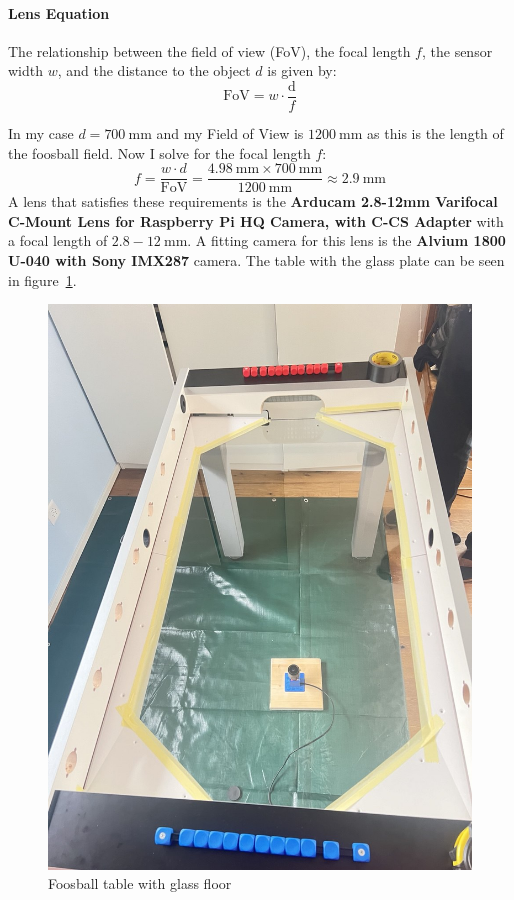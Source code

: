 \paragraph{Lens Equation}\label{par:lens_equation}

The relationship between the field of view (FoV), the focal length $f$, the sensor width $w$, and the distance to the object $d$ is given by:
\begin{equation}
    \text{FoV} = w \cdot \frac{\text{d}}{f}\label{eq:lens_equation}
\end{equation}


\noindent In my case $d = \qty[per-mode=symbol]{700}{\mm}$ and my Field of View is $\qty[per-mode=symbol]{1200}{\mm}$ as this is the length of the foosball field.
Now I solve for the focal length $f$:
\begin{equation}
    \label{eq:focal_length}
    f = \frac{w \cdot d}{\text{FoV}} = \frac{\qty[per-mode=symbol]{4.98}{\mm} \times \qty[per-mode=symbol]{700}{\mm}}{\qty[per-mode=symbol]{1200}{\mm}} \approx \qty[per-mode=symbol]{2.9}{\mm}
\end{equation}
A lens that satisfies these requirements is the \textbf{Arducam 2.8-12mm Varifocal C-Mount Lens for Raspberry Pi HQ Camera, with C-CS Adapter\autocite{arducam-lens}} with a focal length of $2.8-\qty[per-mode=symbol]{12}{\mm}$.
A fitting camera for this lens is the \textbf{Alvium 1800 U-040 with Sony IMX287}\autocite{allied-vision-lens} camera.
The table with the glass plate can be seen in figure~\ref{fig:glass_table}.

\begin{figure}[H]
    \centering
    \includegraphics[width=0.5\linewidth]{../photos/glass_table}
    \caption{Foosball table with glass floor}
    \label{fig:glass_table}
\end{figure}%